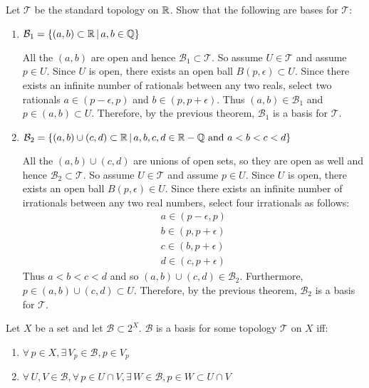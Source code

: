 \documentclass[letterpaper,12pt,fleqn]{article}
\newcommand{\T}{\mathscr{T}}
\newcommand{\B}{\mathcal{B}}
\newcommand{\e}{\epsilon}
\begin{document}
\begin{example}
  Let \(\T\) be the standard topology on \(\mathbb{R}\).  Show that the following are bases for \(\T\):
  \begin{enumerate}
  \item \(\B_1=\setb{(a,b)\subset\R}{a,b\in\Q}\)

    All the \((a,b)\) are open and hence \(\B_1\subset\T\).  So assume \(U\in\T\) and assume \(p\in U\).  Since
    \(U\) is open, there exists an open ball \(B(p,\e)\subset U\).  Since there exists an infinite number of
    rationals between any two reals, select two rationals \(a\in(p-\e,p)\) and \(b\in(p,p+\e)\).  Thus
    \((a,b)\in\B_1\) and \(p\in(a,b)\subset U\).  Therefore, by the previous theorem, \(\B_1\) is a basis for
    \(\T\).

  \item \(\B_2=\setb{(a,b)\cup(c,d)\subset\R}{a,b,c,d\in\R-\Q\ \text{and}\ a<b<c<d}\)

    All the \((a,b)\cup(c,d)\) are unions of open sets, so they are open as well and hence \(\B_2\subset\T\).  So
    assume \(U\in\T\) and assume \(p\in U\).  Since \(U\) is open, there exists an open ball \(B(p,\e)\in U\).
    Since there exists an infinite number of irrationals between any two real numbers, select four irrationals as
    follows:
    \begin{gather*}
      a\in(p-\e,p) \\
      b\in(p,p+\e) \\
      c\in(b,p+\e) \\
      d\in(c,p+\e)
    \end{gather*}
    Thus \(a<b<c<d\) and so \((a,b)\cup(c,d)\in\B_2\). Furthermore, \(p\in(a,b)\cup(c,d)\subset U\).  Therefore, by
    the previous theorem, \(\B_2\) is a basis for \(\T\).
  \end{enumerate}
\end{example}

\begin{theorem}
  Let \(X\) be a set and let \(\B\subset2^X\).  \(\B\) is a basis for some topology \(\T\) on \(X\) iff:
  \begin{enumerate}
  \item \(\forall\,p\in X,\exists\,V_p\in\B,p\in V_p\)
  \item \(\forall\,U,V\in\B,\forall\,p\in U\cap V,\exists\,W\in\B,p\in W\subset U\cap V\)
  \end{enumerate}
\end{theorem}
\end{document}
